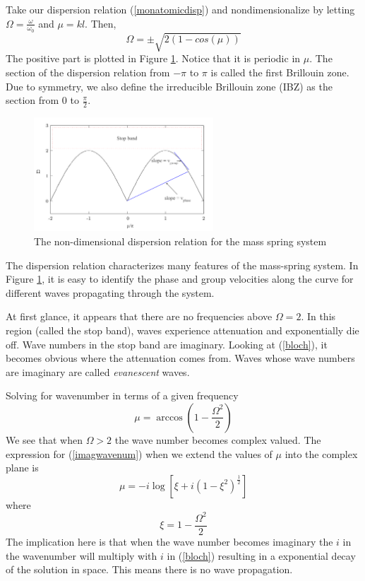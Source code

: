 \documentclass{article}
\begin{document}
Take our dispersion relation (\ref{monatomicdisp}) and nondimensionalize by 
letting $\Omega=\frac{\omega}{\omega_0}$ and $\mu=kl$. Then,
\begin{equation}
\Omega = \pm \sqrt{2(1-cos(\mu))}
\end{equation}
The positive part is plotted in Figure \ref{fig:dr}. Notice that it is periodic 
in $\mu$. The section of the dispersion relation from $-\pi$ to $\pi$ is called 
the first Brillouin zone. Due to symmetry, we also define the irreducible 
Brillouin zone (IBZ) as the section from $0$ to $\frac{\pi}{2}$. 
\begin{figure}[!htbp]
	\centering
	\includegraphics[width=0.6\textwidth]{dispersion-rln.pdf}
	\caption{The non-dimensional dispersion relation for the mass spring system}
	\label{fig:dr}
\end{figure}
The dispersion relation characterizes many features of the mass-spring system. 
In Figure \ref{fig:dr}, it is easy to identify the phase and group velocities 
along the curve for different waves propagating through the system. 

At first glance, it appears that there are no frequencies above $\Omega = 2$. 
In this region (called the stop band), waves experience attenuation and 
exponentially die off. Wave numbers in the stop band are imaginary. Looking at 
(\ref{bloch}), it becomes obvious where the attenuation comes from. Waves whose 
wave numbers are imaginary are called \emph{evanescent} waves.

Solving for wavenumber in terms of a given frequency 
\begin{equation} \label{imagwavenum}
\mu = \arccos{\left(1-\frac{\Omega^2}{2}\right)}
\end{equation}
We see that when $\Omega > 2$ the wave number becomes complex valued. The 
expression for (\ref{imagwavenum}) when we extend the values of $\mu$ into the 
complex plane is 
\begin{equation}
		\mu = -i\log \left[ \xi + i(1-\xi^2)^\frac{1}{2} \right]
\end{equation}
where
\begin{equation}
	\xi = 1-\frac{\Omega^2}{2}
\end{equation}
The implication here is that when the wave number becomes imaginary the $i$ in 
the wavenumber will multiply with $i$ in (\ref{bloch}) resulting in a 
exponential decay of the solution in space. This means there is no wave 
propagation.
\end{document}
